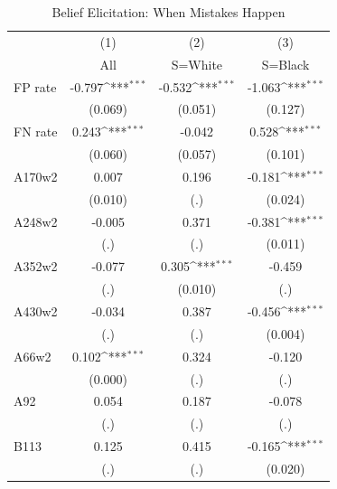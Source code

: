 \begin{table}[htbp]\centering
\def\sym#1{\ifmmode^{#1}\else\(^{#1}\)\fi}
\caption{Belief Elicitation: When Mistakes Happen}
\begin{tabular}{l*{3}{c}}
\hline\hline
                &\multicolumn{1}{c}{(1)}&\multicolumn{1}{c}{(2)}&\multicolumn{1}{c}{(3)}\\
                &\multicolumn{1}{c}{All}&\multicolumn{1}{c}{S=White}&\multicolumn{1}{c}{S=Black}\\
\hline
FP rate         &   -0.797\sym{***}&   -0.532\sym{***}&   -1.063\sym{***}\\
                &  (0.069)         &  (0.051)         &  (0.127)         \\
FN rate         &    0.243\sym{***}&   -0.042         &    0.528\sym{***}\\
                &  (0.060)         &  (0.057)         &  (0.101)         \\
A170w2          &    0.007         &    0.196         &   -0.181\sym{***}\\
                &  (0.010)         &      (.)         &  (0.024)         \\
A248w2          &   -0.005         &    0.371         &   -0.381\sym{***}\\
                &      (.)         &      (.)         &  (0.011)         \\
A352w2          &   -0.077         &    0.305\sym{***}&   -0.459         \\
                &      (.)         &  (0.010)         &      (.)         \\
A430w2          &   -0.034         &    0.387         &   -0.456\sym{***}\\
                &      (.)         &      (.)         &  (0.004)         \\
A66w2           &    0.102\sym{***}&    0.324         &   -0.120         \\
                &  (0.000)         &      (.)         &      (.)         \\
A92             &    0.054         &    0.187         &   -0.078         \\
                &      (.)         &      (.)         &      (.)         \\
B113            &    0.125         &    0.415         &   -0.165\sym{***}\\
                &      (.)         &      (.)         &  (0.020)         \\

\end{tabular}
\end{table}
